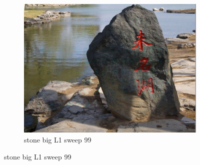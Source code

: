 \documentclass[11pt]{article}
\begin{document}
\begin{figure}[ht!]
\begin{subfigure}[]{0.333\linewidth}
        \centering
        \includegraphics[width=\linewidth]{fig/restoration/stone_big/L1/gibbs_99.jpg}
        \caption{stone big L1 sweep 99}
    \end{subfigure}%
\end{figure}
\end{document}
